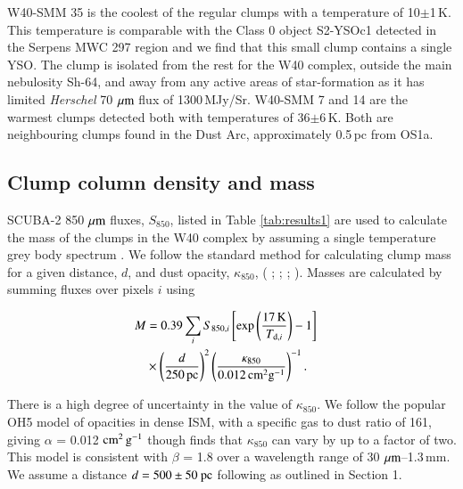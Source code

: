 W40-SMM 35 is the coolest of the regular clumps with a temperature of 10$\pm$1\,K. This temperature is 
comparable with the Class 0 object S2-YSOc1 detected in the Serpens MWC 297 region \citep{Rumble:2015vn} 
and we find that this small clump contains a single YSO. The clump is isolated from the rest for the W40 
complex, outside the main nebulosity Sh-64, and away from any active areas of star-formation as it has limited 
\emph{Herschel} 70\,$\,\mu\rm{m}$ flux of 1300\,MJy/Sr. W40-SMM 7 and 14 are the warmest clumps detected 
both with temperatures of 36$\pm$6\,K. Both are neighbouring clumps found in the Dust Arc, approximately 
0.5\,pc from OS1a.

\subsection{Clump column density and mass}

SCUBA-2 850\,$\,\mu\rm{m}$ fluxes, $S_{\mathrm{850}}$, listed in Table \ref{tab:results1} are 
used to calculate the mass of the clumps in the W40 complex by assuming a single 
temperature grey body spectrum \citep{Hildebrand:1983fy}. We follow the standard 
method for calculating clump mass for a given distance, $d$, and dust opacity, 
$\kappa_{\mathrm{850}}$, (\citeauthor{Johnstone:2000fk} \citeyear{Johnstone:2000fk}; 
\citeauthor{Kirk:2006vn} \citeyear{Kirk:2006vn}; \citeauthor{Sadavoy:2010ve} 
\citeyear{Sadavoy:2010ve}; \citeauthor{Enoch:2011lh} \citeyear{Enoch:2011lh}). 
Masses are calculated by summing fluxes over pixels $i$ using

\begin{eqnarray}
M & = 0.39 \sum_{i} S_{{\mathrm{850},i}}\left [\exp \left(\frac{17\,\mathrm{K}}{T_{\mathrm{d},i}} \right) - 1 \right ] & \nonumber \\
& \times \left(\frac{d}{250\,\mathrm{pc}} \right)^{2}\left(\frac{\kappa_{\mathrm{850}}}{0.012\,\mathrm{\hbox{cm}^{2} \hbox{g}^{-1}}} \right)^{-1}.
\label{eqn:mass}
\end{eqnarray}

There is a high degree of uncertainty in the value of $\kappa_{\mathrm{850}}$. We follow the 
popular OH5 model of opacities in dense ISM, with a specific gas to dust ratio of 161, giving $\alpha$ 
= 0.012 $\hbox{cm}^{2}\,\hbox{g}^{-1}$ though \cite{Henning:1995qf} finds that  $\kappa_{\mathrm{850}}$ 
can vary by up to a factor of two. This model is consistent with $\beta$ = 1.8 over a wavelength 
range of 30\,$\,\mu\rm{m}$--1.3\,mm. We assume a distance $d = 500\pm50\hbox{ pc}$ following 
\cite{Mallick:2013kx} as outlined in Section 1.

